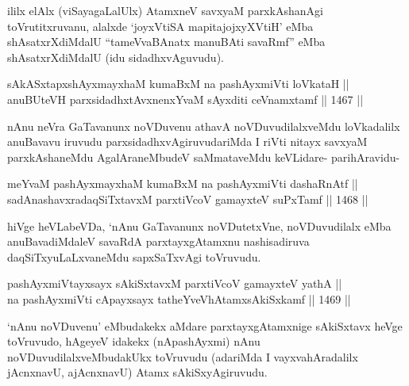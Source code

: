 \begin{artha}
ililx elAlx (viSayagaLalUlx) AtamxneV savxyaM parxkAshanAgi toVrutitxruvanu, alalxde `joyxVtiSA mapitajojxyXVtiH' eMba shAsatxrXdiMdalU ``tameVvaBAnatx manuBAti savaRmf'' eMba shAsatxrXdiMdalU (idu sidadhxvAguvudu).
\end{artha}


\begin{shl}
sAkASxtapxshAyxmayxhaM kumaBxM na pashAyxmiVti loVkataH || \\
anuBUteVH parxsidadhxtAvxnenxYvaM sAyxditi ceVnamxtamf \hfill || 1467 ||  
\end{shl}

\begin{artha}
nAnu neVra GaTavanunx noVDuvenu athavA noVDuvudilalxveMdu loVkadalilx anuBavavu iruvudu parxsidadhxvAgiruvudariMda I riVti nitayx savxyaM parxkAshaneMdu AgalAraneMbudeV saMmataveMdu keVLidare- parihAravidu-
\end{artha}

\begin{shl}
meYvaM pashAyxmayxhaM kumaBxM na pashAyxmiVti dashaRnAtf || \\
sadA\s nashavxradaqSiTxtavxM parxtiVcoV gamayxteV suPxTamf \hfill || 1468 ||  
\end{shl}

\begin{artha}
hiVge heVLabeVDa, `nAnu GaTavanunx noVDutetxVne, noVDuvudilalx eMba anuBavadiMdaleV savaRdA parxtayxgAtamxnu nashisadiruva daqSiTxyuLaLxvaneMdu sapxSaTxvAgi toVruvudu.
\end{artha}


\begin{shl}
pashAyxmiVtayxsayx sAkiSxtavxM parxtiVcoV gamayxteV yathA || \\
na pashAyxmiVti cApayxsayx tatheYveVhA\s \s tamxsAkiSxkamf \hfill || 1469 ||  
\end{shl}

\begin{artha}
`nAnu noVDuvenu' eMbudakekx aMdare parxtayxgAtamxnige sAkiSxtavx heVge toVruvudo, hAgeyeV idakekx (nApashAyxmi) nAnu noVDuvudilalxveMbudakUkx toVruvudu (adariMda I vayxvahAradalilx jAcnxnavU, ajAcnxnavU) Atamx sAkiSxyAgiruvudu.
\end{artha}

